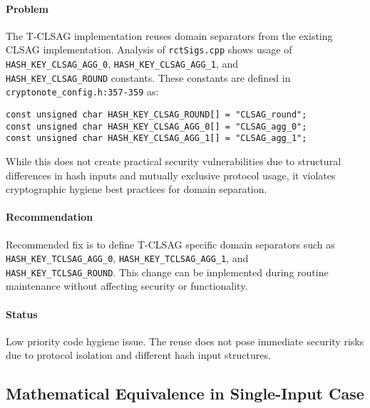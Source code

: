\documentclass{article}
\begin{document}
\paragraph{Problem}
The T-CLSAG implementation reuses domain separators from the existing CLSAG 
implementation.  Analysis of \texttt{rctSigs.cpp} shows usage of 
\texttt{HASH\_KEY\_CLSAG\_AGG\_0}, \texttt{HASH\_KEY\_CLSAG\_AGG\_1}, and \\
\texttt{HASH\_KEY\_CLSAG\_ROUND} constants.  These constants are defined in \\
\texttt{cryptonote\_config.h:357-359} as:
\begin{verbatim}
const unsigned char HASH_KEY_CLSAG_ROUND[] = "CLSAG_round";
const unsigned char HASH_KEY_CLSAG_AGG_0[] = "CLSAG_agg_0";
const unsigned char HASH_KEY_CLSAG_AGG_1[] = "CLSAG_agg_1";
\end{verbatim}
While this does not create practical security vulnerabilities due to structural differences in hash 
inputs and mutually exclusive protocol usage, it violates cryptographic 
hygiene best practices for domain separation.

\paragraph{Recommendation}
Recommended fix is to define T-CLSAG specific domain separators such as 
\texttt{HASH\_KEY\_TCLSAG\_AGG\_0}, \texttt{HASH\_KEY\_TCLSAG\_AGG\_1}, and \\
\texttt{HASH\_KEY\_TCLSAG\_ROUND}.  This change can be implemented during 
routine maintenance without affecting security or functionality.

\paragraph{Status}
Low priority code hygiene issue.  The reuse does not pose immediate security 
risks due to protocol isolation and different hash input structures.

\subsection{Mathematical Equivalence in Single-Input Case}
\end{document}
